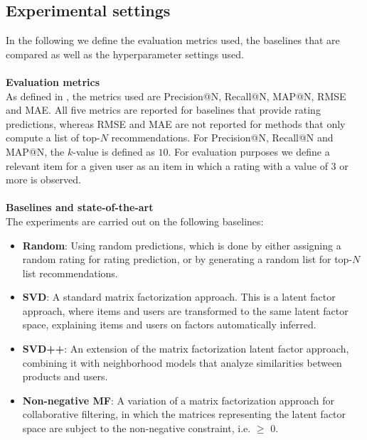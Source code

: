 \subsection{Experimental settings}
In the following we define the evaluation metrics used, the baselines that are compared as well as the hyperparameter settings used.
\\\\
\textbf{Evaluation metrics}\\
As defined in , the metrics used are Precision@N, Recall@N, MAP@N, RMSE and MAE.
All five metrics are reported for baselines that provide rating predictions, whereas RMSE and MAE are not reported for methods that only compute a list of top-$N$ recommendations.
For Precision@N, Recall@N and MAP@N, the $k$-value is defined as $10$.
For evaluation purposes we define a relevant item for a given user as an item in which a rating with a value of $3$ or more is observed.
\\\\
\textbf{Baselines and state-of-the-art}\\
The experiments are carried out on the following baselines:
\begin{itemize}
    \item \textbf{Random}: Using random predictions, which is done by either assigning a random rating for rating prediction, or by generating a random list for top-$N$ list recommendations.
    \item \textbf{SVD}: A standard matrix factorization approach. This is a latent factor approach, where items and users are transformed to the same latent factor space, explaining items and users on factors automatically inferred.
    \item \textbf{SVD++}: An extension of the matrix factorization latent factor approach, combining it with neighborhood models that analyze similarities between products and users.
    \item \textbf{Non-negative MF}: A variation of a matrix factorization approach for collaborative filtering, in which the matrices representing the latent factor space are subject to the non-negative constraint, i.e. $\geq$ 0.
\end{itemize}

